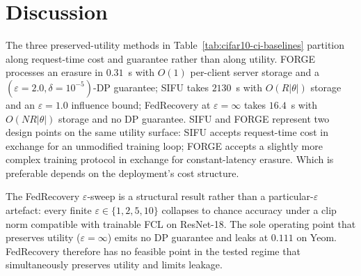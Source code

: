 \section{Discussion}
\label{sec:discussion}

The three preserved-utility methods in Table~\ref{tab:cifar10-ci-baselines} partition
along request-time cost and guarantee rather than along utility. FORGE processes an
erasure in $0.31$~s with $O(1)$ per-client server storage and a
$(\varepsilon{=}2.0, \delta{=}10^{-5})$-DP guarantee; SIFU takes $2130$~s with
$O(R|\theta|)$ storage and an $\varepsilon{=}1.0$ influence bound; FedRecovery at
$\varepsilon{=}\infty$ takes $16.4$~s with $O(NR|\theta|)$ storage and no DP
guarantee. SIFU and FORGE represent two design points on the same utility surface:
SIFU accepts request-time cost in exchange for an unmodified training loop; FORGE
accepts a slightly more complex training protocol in exchange for constant-latency
erasure. Which is preferable depends on the deployment's cost structure.

The FedRecovery $\varepsilon$-sweep is a structural result rather than a
particular-$\varepsilon$ artefact: every finite $\varepsilon \in \{1,2,5,10\}$
collapses to chance accuracy under a clip norm compatible with trainable FCL on
ResNet-18. The sole operating point that preserves utility ($\varepsilon{=}\infty$)
emits no DP guarantee and leaks at $0.111$ on Yeom. FedRecovery therefore has no
feasible point in the tested regime that simultaneously preserves utility and limits
leakage.
